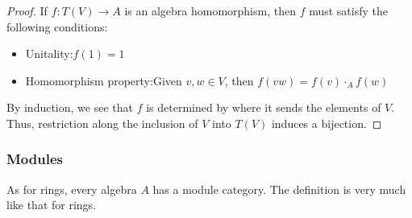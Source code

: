 \documentclass[../thesis.tex]{subfiles}
\begin{document}
            \begin{proof}
                If $f: T(V) \rightarrow A$ is an algebra homomorphism, then $f$ must satisfy the following conditions:
                \begin{itemize}
                    \item Unitality:\quad $f(1) = 1$
                    \item Homomorphism property:\quad Given $v,w\in V$, then $f(v w) = f(v)\cdot_Af(w)$
                \end{itemize}
                By induction, we see that $f$ is determined by where it sends the elements of $V$. Thus, restriction along the inclusion of $V$ into $T(V)$ induces a bijection.
            \end{proof}

            \subsubsection*{Modules}

                As for rings, every algebra $A$ has a module category. The definition is very much like that for rings.
\end{document}
